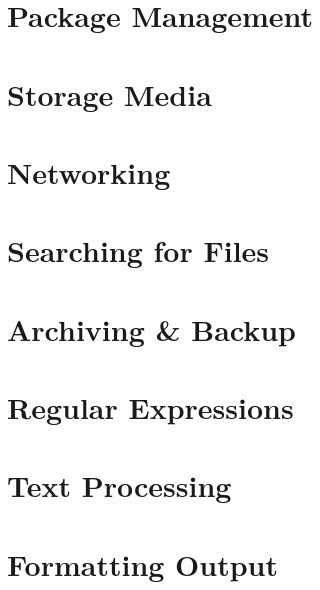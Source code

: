 \documentclass[oneside]{book}
\numberwithin{equation}{section}
\begin{document}

\section{Package Management}


\section{Storage Media}


\section{Networking}


\section{Searching for Files}


\section{Archiving \& Backup}


\section{Regular Expressions}


\section{Text Processing}


\section{Formatting Output}
\end{document}
